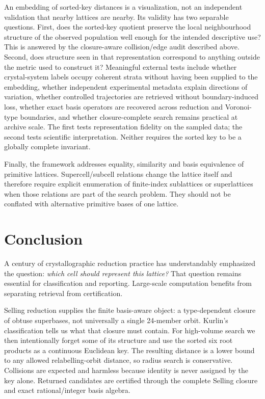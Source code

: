 \documentclass[11pt]{article}
\begin{document}
An embedding of sorted-key distances is a visualization, not an independent validation that nearby lattices are nearby. Its validity has two separable questions. First, does the sorted-key quotient preserve the local neighbourhood structure of the observed population well enough for the intended descriptive use? This is answered by the closure-aware collision/edge audit described above. Second, does structure seen in that representation correspond to anything outside the metric used to construct it? Meaningful external tests include whether crystal-system labels occupy coherent strata without having been supplied to the embedding, whether independent experimental metadata explain directions of variation, whether controlled trajectories are retrieved without boundary-induced loss, whether exact basis operators are recovered across reduction and Voronoi-type boundaries, and whether closure-complete search remains practical at archive scale. The first tests representation fidelity on the sampled data; the second tests scientific interpretation. Neither requires the sorted key to be a globally complete invariant.

Finally, the framework addresses equality, similarity and basis equivalence of primitive lattices. Supercell/subcell relations change the lattice itself and therefore require explicit enumeration of finite-index sublattices or superlattices when those relations are part of the search problem. They should not be conflated with alternative primitive bases of one lattice.

\section{Conclusion}

A century of crystallographic reduction practice has understandably emphasized the question: \emph{which cell should represent this lattice?} That question remains essential for classification and reporting. Large-scale computation benefits from separating retrieval from certification.

Selling reduction supplies the finite basis-aware object: a type-dependent closure of obtuse superbases, not universally a single 24-member orbit. Kurlin's classification tells us what that closure must contain. For high-volume search we then intentionally forget some of its structure and use the sorted six root products as a continuous Euclidean key. The resulting distance is a lower bound to any allowed relabelling-orbit distance, so radius search is conservative. Collisions are expected and harmless because identity is never assigned by the key alone. Returned candidates are certified through the complete Selling closure and exact rational/integer basis algebra.
\end{document}
